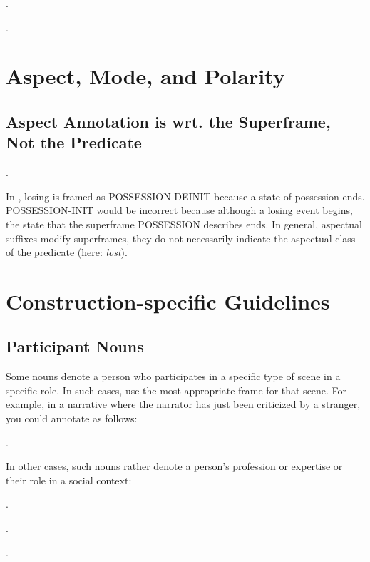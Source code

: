 \documentclass[a4paper]{article}
\newcommand{\fr}[1]{\textsf{#1}}
\begin{document}
\ex.

\ex.

\newpage\section{Aspect, Mode, and Polarity}

\subsection{Aspect Annotation is wrt. the Superframe, Not the Predicate}

\ex.

In \Last, losing is framed as \fr{POSSESSION-DEINIT} because a state of
possession ends. \fr{POSSESSION-INIT} would be incorrect because although a
losing event begins, the state that the superframe \fr{POSSESSION} describes
ends. In general, aspectual suffixes modify superframes, they do not
necessarily indicate the aspectual class of the predicate (here: \emph{lost}).

\newpage\section{Construction-specific Guidelines}

\subsection{Participant Nouns}

Some nouns denote a person who participates in a specific type of scene in a
specific role. In such cases, use the most appropriate frame for that scene.
For example, in a narrative where the narrator has just been criticized by a
stranger, you could annotate as follows:

\ex.

In other cases, such nouns rather denote a person's profession or expertise or
their role in a social context:

\ex.

\ex.

\ex.
\end{document}
